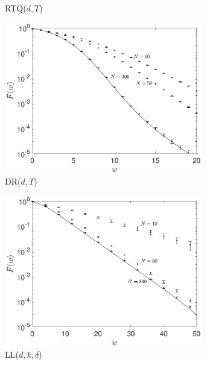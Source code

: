 \documentclass[12pt]{report}
\begin{document}
\begin{figure}[t]
\begin{subfigure}{.49\textwidth}
\caption{RTQ($d,T$)}
\label{fig:num_accuracy_RTQ}
\end{subfigure}
\begin{subfigure}{.49\textwidth}
\centering
\includegraphics[width=0.95\textwidth]{figures/Chapter4/WL_simul_DR.pdf}
\caption{DR($d,T$)}
\label{fig:num_accuracy_DR}
\end{subfigure}
\begin{subfigure}{.49\textwidth}
\centering
\includegraphics[width=0.95\textwidth]{figures/Chapter4/WL_simul_LLdk.pdf}
\caption{LL($d,k,\delta$)}
\label{fig:num_accuracy_LLdk}
\end{subfigure}
\begin{subfigure}{.49\textwidth}
\centering

\end{subfigure}
\end{figure}
\end{document}
